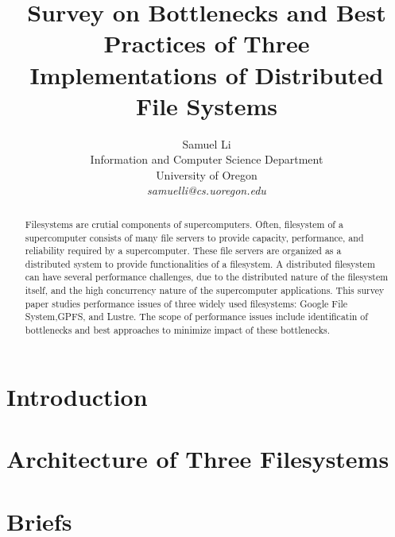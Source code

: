 \documentclass[12pt,twocolumn]{IEEEtran11}
\begin{document}


\title{\Large \bf 
Survey on Bottlenecks and Best Practices of Three Implementations of
Distributed File Systems
}
\author{
Samuel Li\\
Information and Computer Science Department\\
University of Oregon\\
{\em samuelli@cs.uoregon.edu}
}
\maketitle
\begin{abstract}
Filesystems are crutial components of supercomputers.
%
Often, filesystem of a supercomputer consists of many file servers
to provide capacity, performance, and reliability
required by a supercomputer.
%
These file servers are organized as a distributed system
to provide functionalities of a filesystem.
%
A distributed filesystem can have several performance challenges,
due to the distributed nature of the filesystem itself,
and the high concurrency nature of the supercomputer applications.
%
This survey paper studies performance issues of three widely 
used filesystems: Google File System,GPFS, and Lustre.
%
The scope of performance issues include identificatin of bottlenecks
and best approaches to minimize impact of these bottlenecks.
\end{abstract}


\section{Introduction}
\label{sec:intro}


\section{Architecture of Three Filesystems}
\label{sec:architecture}


\section{Briefs}
\label{sec:brief}



\end{document}
